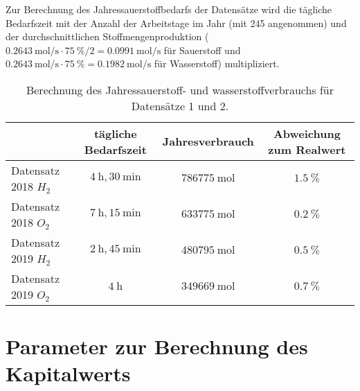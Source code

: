 Zur Berechnung des Jahressauerstoffbedarfs der Datensätze wird die tägliche Bedarfszeit mit der Anzahl der Arbeitstage im Jahr (mit 245 angenommen) und der durchschnittlichen Stoffmengenproduktion ($\SI{0,2643}{\mol\per\s} \cdot \SI{75}{\%} / 2 = \SI{0,0991}{\mol\per\s}$ für Sauerstoff und $\SI{0,2643}{\mol\per\s} \cdot \SI{75}{\%} = \SI{0,1982}{\mol\per\s}$ für Wasserstoff) multipliziert. 

\begin{table}[ht]
		\centering
		\caption{Berechnung des Jahressauerstoff- und wasserstoffverbrauchs für Datensätze 1 und 2.}
		\begin{tabular}{l c c c}
		\toprule
		 & tägliche Bedarfszeit & Jahresverbrauch & Abweichung zum Realwert\\
		\midrule
		Datensatz 2018 $H_2$ & $\SI{4}{\hour},\SI{30}{\minute}$ & $\SI{786775}{\mol}$ & $\SI{1,5}{\%}$\\
		Datensatz 2018 $O_2$ & $\SI{7}{\hour},\SI{15}{\minute}$ & $\SI{633775}{\mol}$ & $\SI{0,2}{\%}$\\
		Datensatz 2019 $H_2$ & $\SI{2}{\hour},\SI{45}{\minute}$ & $\SI{480795}{\mol}$ & $\SI{0,5}{\%}$\\
		Datensatz 2019 $O_2$ & $\SI{4}{\hour}$ & $ \SI{349669}{\mol}$ & $\SI{0,7}{\%}$\\
		\bottomrule
		\end{tabular}
		\label{tb:VerbrauchSimulation}
\end{table}	

\chapter{Parameter zur Berechnung des Kapitalwerts}
\label{Apx:Kapitalwert}

